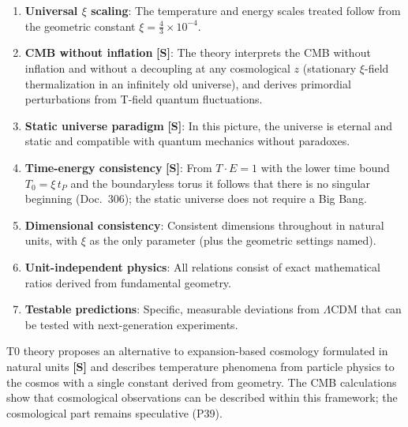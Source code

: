 	\begin{enumerate}
		\item \textbf{Universal $\xi$ scaling}: The temperature and energy scales treated follow from the geometric constant $\xi = \frac{4}{3} \times 10^{-4}$.
		
		\item \textbf{CMB without inflation} \textbf{[S]}: The theory interprets the CMB without inflation and without a decoupling at any cosmological $z$ (stationary $\xi$-field thermalization in an infinitely old universe), and derives primordial perturbations from T-field quantum fluctuations.
		
		\item \textbf{Static universe paradigm} \textbf{[S]}: In this picture, the universe is eternal and static and compatible with quantum mechanics without paradoxes.
		
		\item \textbf{Time-energy consistency} \textbf{[S]}: From $T\cdot E = 1$ with the lower time bound $T_0 = \xi\,t_P$ and the boundaryless torus it follows that there is no singular beginning (Doc.~306); the static universe does not require a Big Bang.
		
		\item \textbf{Dimensional consistency}: Consistent dimensions throughout in natural units, with $\xi$ as the only parameter (plus the geometric settings named).
		
		\item \textbf{Unit-independent physics}: All relations consist of exact mathematical ratios derived from fundamental geometry.
		
		\item \textbf{Testable predictions}: Specific, measurable deviations from $\Lambda$CDM that can be tested with next-generation experiments.
	\end{enumerate}
	
	\begin{important}[Conclusion]
		T0 theory proposes an alternative to expansion-based cosmology formulated in natural units \textbf{[S]} and describes temperature phenomena from particle physics to the cosmos with a single constant derived from geometry. The CMB calculations show that cosmological observations can be described within this framework; the cosmological part remains speculative (P39).
	\end{important}
	

